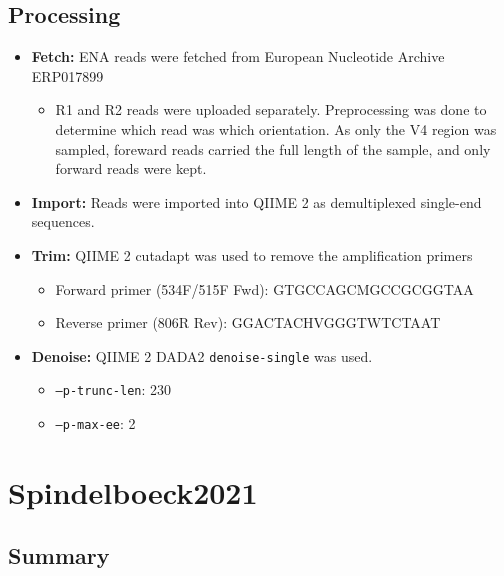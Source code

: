 \documentclass[11pt,a4paper]{article}
\begin{document}
\subsection{Processing}
\begin{itemize}
\item \textbf{Fetch:} ENA reads were fetched from European Nucleotide Archive ERP017899
\begin{itemize}
    \item R1 and R2 reads were uploaded separately. Preprocessing was done to determine which read was which orientation. As only the V4 region was sampled, foreward reads carried the full length of the sample, and only forward reads were kept. 
\end{itemize}
\item \textbf{Import:} Reads were imported into QIIME 2 as demultiplexed single-end sequences. 
\item \textbf{Trim:} QIIME 2 cutadapt was used to remove the amplification primers
  \begin{itemize}
  \item Forward primer (534F/515F Fwd): GTGCCAGCMGCCGCGGTAA
  \item Reverse primer (806R Rev): GGACTACHVGGGTWTCTAAT
  \end{itemize}
\item \textbf{Denoise:} QIIME 2 DADA2 \texttt{denoise-single} was used.  
  \begin{itemize}
  \item \texttt{--p-trunc-len}: 230
  \item \texttt{--p-max-ee}: 2
  \end{itemize}
\end{itemize}


\section{Spindelboeck2021}
\subsection{Summary}
\end{document}
